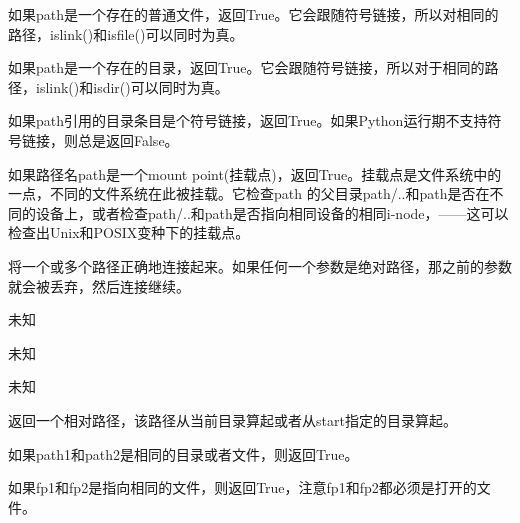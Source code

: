 \noindent{\color{red}{os.path.isfile(path):}}
\par{如果path是一个存在的普通文件，返回True。它会跟随符号链接，所以对相同的路径，islink()和isfile()可以同时为真。}\\

\noindent{\color{red}{os.path.isdir(path):}}
\par{如果path是一个存在的目录，返回True。它会跟随符号链接，所以对于相同的路径，islink()和isdir()可以同时为真。}\\

\noindent{\color{red}{os.path.islink(path):}}
\par{如果path引用的目录条目是个符号链接，返回True。如果Python运行期不支持符号链接，则总是返回False。}\\

\noindent{\color{red}{os.path.ismount(path):}}
\par{如果路径名path是一个mount point(挂载点)，返回True。挂载点是文件系统中的一点，不同的文件系统在此被挂载。它检查path
的父目录path/..和path是否在不同的设备上，或者检查path/..和path是否指向相同设备的相同i-node，——这可以检查出Unix和POSIX变种下的挂载点。}\\

\noindent{\color{red}{os.path.join(path, *paths):}}
\par{将一个或多个路径正确地连接起来。如果任何一个参数是绝对路径，那之前的参数就会被丢弃，然后连接继续。}\\

\noindent{\color{red}{os.path.normcase(path):}}
\par{未知}\\

\noindent{\color{red}{os.path.normpath(path):}}
\par{未知}\\

\noindent{\color{red}{os.path.realpath(path):}}
\par{未知}\\

\noindent{\color{red}{os.path.relpath(path, start=os.curdir):}}
\par{返回一个相对路径，该路径从当前目录算起或者从start指定的目录算起。}\\

\noindent{\color{red}{os.path.samefile(path1, path2):}}
\par{如果path1和path2是相同的目录或者文件，则返回True。}\\

\noindent{\color{red}{os.path.sameopenfile(fp1, fp2):}}
\par{如果fp1和fp2是指向相同的文件，则返回True，注意fp1和fp2都必须是打开的文件。}\\

